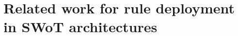 \documentclass[sw]{iosart2x}
\begin{document}
%


\section{Related work for rule deployment in SWoT architectures}
\label{sec:related_work_distribution}
\end{document}

